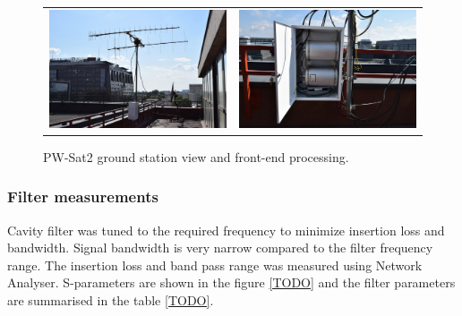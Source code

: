 \begin{figure}
   \centering
\begin{tabular}{cc}
        \includegraphics[width=0.3\paperwidth]{img/5/elka_view.jpg}
    & 
        \includegraphics[width=0.3\paperwidth]{img/5/elka_skrzynka.jpg}
\end{tabular}
\label{elka_skrzynka}
\caption{PW-Sat2 ground station view and front-end processing.}
\end{figure}

\subsubsection{Filter measurements}
Cavity filter was tuned to the required frequency to minimize insertion loss and bandwidth. Signal bandwidth is very narrow compared to the filter frequency range.
The insertion loss and band pass range was measured using Network Analyser. S-parameters are shown in the figure \ref{TODO} and the filter parameters are summarised in the table \ref{TODO}.

